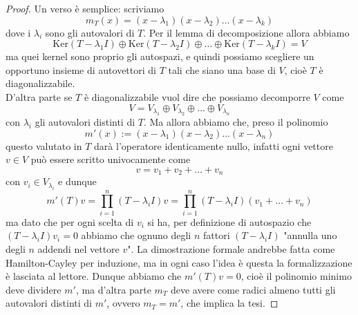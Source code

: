 \documentclass[11pt]{scrartcl}
\renewcommand{\ker}[1]{\text{Ker}\left(#1\right)}
\begin{document}
   	 \begin{proof}
   	 	Un verso è semplice: scriviamo
   	 	$$m_T(x)=(x-\lambda_1)(x-\lambda_2)\dots(x-\lambda_k)$$
   	 	dove i $\lambda_i$ sono gli autovalori di $T$. Per il lemma di decomposizione allora abbiamo
   	 	$$\ker{T-\lambda_1I}\oplus \ker{T-\lambda_2I}\oplus \dots \oplus \ker{T-\lambda_kI}=V$$
   	 	ma quei kernel sono proprio gli autospazi, e quindi possiamo scegliere un opportuno insieme di autovettori di $T$ tali che siano una base di $V$, cioè $T$ è diagonalizzabile. \\
   	 	D'altra parte se $T$ è diagonalizzabile vuol dire che possiamo decomporre $V$ come
   	 	$$V=V_{\lambda_1}\oplus V_{\lambda_2}\oplus \dots \oplus V_{\lambda_n}$$
   	 	con $\lambda_i$ gli autovalori distinti di $T$. Ma allora abbiamo che, preso il polinomio
   	 	$$m'(x):=(x-\lambda_1)(x-\lambda_2)\dots (x-\lambda_n)$$
   	 	questo valutato in $T$ darà l'operatore identicamente nullo, infatti ogni vettore $v\in V$ può essere scritto univocamente come
   	 	$$v=v_1+v_2+\dots+ v_n$$
   	 	con $v_i\in V_{\lambda_i}$ e dunque 
   	 	$$m'(T)v=\prod_{i=1}^{n}\left(T-\lambda_iI\right)v=\prod_{i=1}^{n}\left(T-\lambda_iI\right)\left(v_1+\dots+v_n\right)$$
   	 	ma dato che per ogni scelta di $v_i$ si ha, per definizione di autospazio che $(T-\lambda_iI)v_i=0$ abbiamo che ognuno degli $n$ fattori $(T-\lambda_iI)$ "annulla uno degli $n$ addendi nel vettore $v$". La dimostrazione formale andrebbe fatta come Hamilton-Cayley per induzione, ma in ogni caso l'idea è questa la formalizzazione è lasciata al lettore. Dunque abbiamo che $m'(T)v=0$, cioè il polinomio minimo deve dividere $m'$, ma d'altra parte $m_T$ deve avere come radici almeno tutti gli autovalori distinti di $m'$, ovvero $m_T=m'$, che implica la tesi.
   	 \end{proof}
\end{document}
